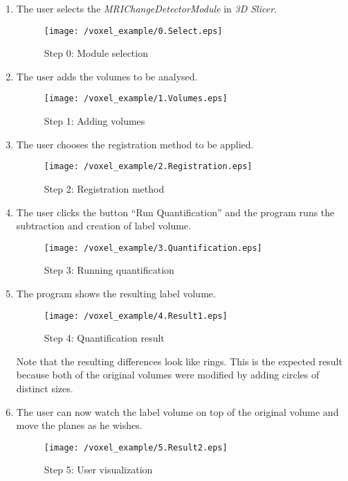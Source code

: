 \begin{enumerate}
\item The user selects the \textit{MRIChangeDetectorModule} in \textit{3D Slicer}.

  \begin{figure}[H]
    \centering
    \texttt{[image: /voxel\_example/0.Select.eps]}
    \caption{Step 0: Module selection}
    \label{voxel_ex_0}
  \end{figure}
  
\item The user adds the volumes to be analysed.
  
  \begin{figure}[H]
    \centering
    \texttt{[image: /voxel\_example/1.Volumes.eps]}
    \caption{Step 1: Adding volumes}
    \label{voxel_ex_1}
  \end{figure}
  
\item The user chooses the registration method to be applied.
  
  \begin{figure}[H]
    \centering
    \texttt{[image: /voxel\_example/2.Registration.eps]}
    \caption{Step 2: Registration method}
    \label{voxel_ex_2}
  \end{figure}
  
  
\item The user clicks the button ``Run Quantification'' and the
  program runs the subtraction and creation of label volume.
  
  \begin{figure}[H]
    \centering
    \texttt{[image: /voxel\_example/3.Quantification.eps]}
    \caption{Step 3: Running quantification}
    \label{voxel_ex_3}
  \end{figure}
  
\item The program shows the resulting label volume.
  
  \begin{figure}[H]
    \centering
    \texttt{[image: /voxel\_example/4.Result1.eps]}
    \caption{Step 4: Quantification result}
    \label{voxel_ex_4}
  \end{figure}

  Note that the resulting differences look like rings. This is the
  expected result because both of the original volumes were modified
  by adding circles of distinct sizes.
  
\item The user can now watch the label volume on top of the original
  volume and move the planes as he wishes.
  
  \begin{figure}[H]
    \centering
    \texttt{[image: /voxel\_example/5.Result2.eps]}
    \caption{Step 5: User visualization}
    \label{voxel_ex_5}
  \end{figure}

\end{enumerate}


